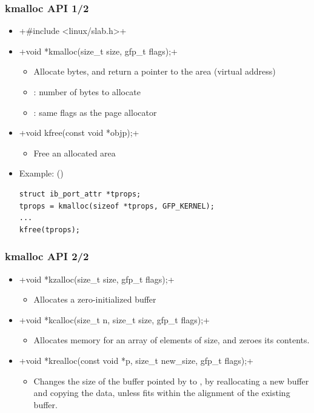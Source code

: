 \begin{frame}[fragile]
  \frametitle{kmalloc API 1/2}
  \begin{itemize}
  \item {}+#include <linux/slab.h>+
  \item {}+void *kmalloc(size_t size, gfp_t flags);+
    \begin{itemize}
    \item Allocate  bytes, and return a pointer to the area
      (virtual address)
    \item {}: number of bytes to allocate
    \item {}: same flags as the page allocator
    \end{itemize}
  \item {}+void kfree(const void *objp);+
    \begin{itemize}
    \item Free an allocated area
    \end{itemize}
  \item Example: ()
\begin{verbatim}
struct ib_port_attr *tprops;
tprops = kmalloc(sizeof *tprops, GFP_KERNEL);
...
kfree(tprops);
\end{verbatim}
  \end{itemize}
\end{frame}

\begin{frame}[fragile]
  \frametitle{kmalloc API 2/2}
  \begin{itemize}
  \item {}+void *kzalloc(size_t size, gfp_t flags);+
    \begin{itemize}
    \item Allocates a zero-initialized buffer
    \end{itemize}
  \item {}+void *kcalloc(size_t n, size_t size, gfp_t flags);+
    \begin{itemize}
    \item Allocates memory for an array of  elements of
       size, and zeroes its contents.
    \end{itemize}
  \item {}+void *krealloc(const void *p, size_t new_size, gfp_t flags);+
    \begin{itemize}
    \item Changes the size of the buffer pointed by  to
      , by reallocating a new buffer and copying the
      data, unless  fits within the alignment of
      the existing buffer.
    \end{itemize}
  \end{itemize}
\end{frame}


